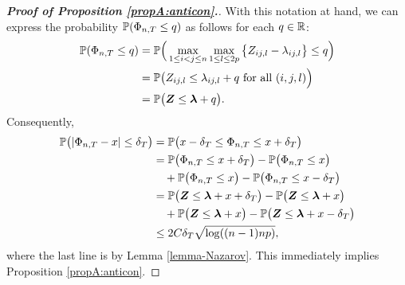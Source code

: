 \begin{proof}[\textnormal{\textbf{Proof of Proposition \ref{propA:anticon}.}}]
With this notation at hand, we can express the probability $\mathbb{P}(\Phi_{n,T} \le q)$ as follows for each $q \in \mathbb{R}$: 
\begin{align*} 
\mathbb{P}(\Phi_{n,T} \le q) 
 & = \mathbb{P} \Big( \max_{1\leq i< j \leq n}\max_{1 \le l \le 2p} \big\{ Z_{ij,l} - \lambda_{ij,l} \big\} \le q \Big) \\
 & = \mathbb{P} \big( Z_{ij,l} \le \lambda_{ij,l} + q \text{ for all } (i,j,l) \Big) \\
 & = \mathbb{P} \big( \boldsymbol{Z} \le \boldsymbol{\lambda} + q \big). 
\end{align*}
Consequently,
\begin{align*}
\mathbb{P}\big( |\Phi_{n,T} - x| \le \delta_T \big) 
 & = \mathbb{P} \big( x - \delta_T \le \Phi_{n,T} \le x + \delta_T \big) \\
 & = \mathbb{P} \big( \Phi_{n,T} \le x + \delta_T \big) - \mathbb{P} \big( \Phi_{n,T} \le x \big) \\
 & \quad + \mathbb{P} \big( \Phi_{n,T} \le x \big) - \mathbb{P} \big( \Phi_{n,T} \le x - \delta_T \big) \\
 & = \mathbb{P} \big( \boldsymbol{Z} \le \boldsymbol{\lambda} + x + \delta_T \big) - \mathbb{P} \big( \boldsymbol{Z} \le \boldsymbol{\lambda} + x \big) \\
 & \quad + \mathbb{P} \big( \boldsymbol{Z} \le \boldsymbol{\lambda} + x \big) - \mathbb{P} \big( \boldsymbol{Z} \le \boldsymbol{\lambda} + x - \delta_T\big) \\
 & \le 2 C \delta_T \sqrt{\log((n-1)np)},
\end{align*} 
where the last line is by Lemma \ref{lemma-Nazarov}. This immediately implies Proposition \ref{propA:anticon}.
\end{proof}


